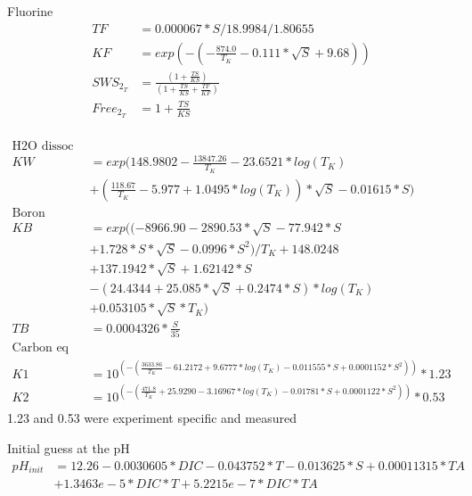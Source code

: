 \documentclass{ruthesis}
\begin{document}
Fluorine
\begin{align*}
TF       	&= 0.000067*S/18.9984/1.80655 \nonumber \\
KF       	&= exp(-(-\frac{874.0}{T_K} - 0.111*\sqrt{S} + 9.68)) \nonumber \\
SWS_{2_T}  	&= \frac{(1 + \frac{TS}{KS})}{(1 + \frac{TS}{KS} + \frac{TF}{KF})} \nonumber \\
Free_{2_T} 	&= 1 + \frac{TS}{KS} \nonumber \\
\end{align*}


\begin{align*}
\text{H2O dissoc} \nonumber \\
KW 		&= exp(148.9802 - \frac{13847.26}{T_K}  - 23.6521*log(T_K) \nonumber \\
		&+ (\frac{118.67}{T_K} - 5.977 + 1.0495*log(T_K))*\sqrt{S} - 0.01615*S) \nonumber \\
\text{Boron} \nonumber \\
KB 		&= exp((-8966.90 - 2890.53*\sqrt{S} - 77.942*S \nonumber \\
		&+ 1.728*S*\sqrt{S} - 0.0996*S^2)/T_K + 148.0248 \nonumber \\
		& + 137.1942*\sqrt{S} + 1.62142*S \nonumber \\
		&- (24.4344 + 25.085*\sqrt{S} + 0.2474*S)*log(T_K)  \nonumber \\ 
		&+ 0.053105*\sqrt{S}*T_K) \nonumber \\
TB 		&= 0.0004326*\frac{S}{35} \nonumber \\
\text{Carbon eq constants} \nonumber \\
K1 		&= 10^{(-(\frac{3633.86}{T_K} - 61.2172 + 9.6777 *log(T_K) - 0.011555*S + 0.0001152*S^2))}*1.23	\nonumber \\
K2 		&= 10^{(-(\frac{471.8}{T_K} + 25.9290 - 3.16967*log(T_K) - 0.01781*S + 0.0001122*S^2))}*0.53 \nonumber \\	
\end{align*}
1.23 and 0.53 were experiment specific and measured 


Initial guess at the pH 
\begin{align*}
pH_{init} 	&= 12.26 -0.0030605*DIC -0.043752*T -0.013625*S+ 0.00011315*TA \nonumber \\
&+ 1.3463e-5*DIC*T + 5.2215e-7*DIC*TA \nonumber \\
\end{align*}
\end{document}
